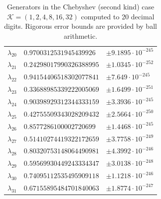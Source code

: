 \documentclass[a4paper,10pt]{article}
\begin{document}
\begin{appendix}
\begin{table}
\begin{tabular}{|l|ll|}
  $\lambda_{20}$ & $0.9700312531945439926$   &  $\pm 9.1895 \cdot 10^{-245}$ \\
  $\lambda_{21}$ & $0.24298017990326388995$  &  $\pm 1.0345 \cdot 10^{-252}$ \\
  $\lambda_{22}$ & $0.94154406518302077841$  &  $\pm 7.649 \cdot 10^{-245}$ \\
  $\lambda_{23}$ & $0.33688985339222005069$  &  $\pm 1.6499 \cdot 10^{-251}$ \\
  $\lambda_{24}$ & $0.90398929312344333159$  &  $\pm 3.3936 \cdot 10^{-245}$ \\
  $\lambda_{25}$ & $0.42755509343028209432$  &  $\pm 2.5664 \cdot 10^{-250}$ \\
  $\lambda_{26}$ & $0.8577286100002720699$   &  $\pm 1.4468 \cdot 10^{-245}$ \\
  $\lambda_{27}$ & $0.51410274419322172659$  &  $\pm 3.7758 \cdot 10^{-249}$ \\
  $\lambda_{28}$ & $0.80320753148064490981$  &  $\pm 4.3992 \cdot 10^{-246}$ \\
  $\lambda_{29}$ & $0.59569930449243334347$  &  $\pm 3.0138 \cdot 10^{-248}$ \\
  $\lambda_{30}$ & $0.74095112535495909118$  &  $\pm 1.1218 \cdot 10^{-246}$ \\
  $\lambda_{31}$ & $0.67155895484701840063$  &  $\pm 1.8774 \cdot 10^{-247}$ \\
  \hline
  \end{tabular}
  \caption{Generators in the Chebyshev (second kind) case $\mathcal{K} = (1, 2, 4, 8, 16, 32)$
  computed to 20 decimal digits. Rigorous error bounds are provided by ball
  arithmetic.}
\end{table}


\end{appendix}
\end{document}
